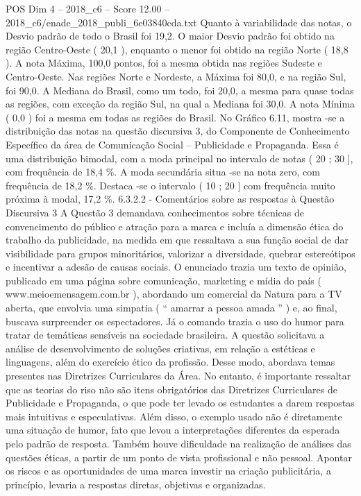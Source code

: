 \begin{textsample}{POS Dim 4 – 2018\_c6 – Score 12.00 – 2018\_c6/enade\_2018\_publi\_6e03840cda.txt}
Quanto à variabilidade das notas, o Desvio padrão de todo o Brasil foi 19,2.
O maior Desvio padrão foi obtido na região Centro-Oeste ( 20,1 ), enquanto o menor foi obtido na região Norte ( 18,8 ).
A nota Máxima, 100,0 pontos, foi a mesma obtida nas regiões Sudeste e Centro-Oeste.
Nas regiões Norte e Nordeste, a Máxima foi 80,0, e na região Sul, foi 90,0.
A Mediana do Brasil, como um todo, foi 20,0, a mesma para quase todas as regiões, com exceção da região Sul, na qual a Mediana foi 30,0.
A nota Mínima ( 0,0 ) foi a mesma em todas as regiões do Brasil.
No Gráfico 6.11, mostra -se a distribuição das notas na questão discursiva 3, do Componente de Conhecimento Específico da área de Comunicação Social – Publicidade e Propaganda.
Essa é uma distribuição bimodal, com a moda principal no intervalo de notas ( 20 ; 30 ], com frequência de 18,4 \%.
A moda secundária situa -se na nota zero, com frequência de 18,2 \%.
Destaca -se o intervalo ( 10 ; 20 ] com frequência muito próxima à modal, 17,2 \%. 6.3.2.2 - Comentários sobre as respostas à Questão Discursiva 3 A Questão 3 demandava conhecimentos sobre técnicas de convencimento do público e atração para a marca e incluía a dimensão ética do trabalho da publicidade, na medida em que ressaltava a sua função social de dar visibilidade para grupos minoritários, valorizar a diversidade, quebrar estereótipos e incentivar a adesão de causas sociais.
O enunciado trazia um texto de opinião, publicado em uma página sobre comunicação, marketing e mídia do país ( www.meioemensagem.com.br ), abordando um comercial da Natura para a TV aberta, que envolvia uma simpatia ( “ amarrar a pessoa amada ” ) e, ao final, buscava surpreender os espectadores.
Já o comando trazia o uso do humor para tratar de temáticas sensíveis na sociedade brasileira.
A questão solicitava a análise de desenvolvimento de soluções criativas, em relação a estéticas e linguagens, além do exercício ético da profissão.
Desse modo, abordava temas presentes nas Diretrizes Curriculares da Área.
No entanto, é importante ressaltar que as teorias do riso não são itens obrigatórios das Diretrizes Curriculares de Publicidade e Propaganda, o que pode ter levado os estudantes a darem respostas mais intuitivas e especulativas.
Além disso, o exemplo usado não é diretamente uma situação de humor, fato que levou a interpretações diferentes da esperada pelo padrão de resposta.
Também houve dificuldade na realização de análises das questões éticas, a partir de um ponto de vista profissional e não pessoal.
Apontar os riscos e as oportunidades de uma marca investir na criação publicitária, a princípio, levaria a respostas diretas, objetivas e organizadas.

\end{textsample}
